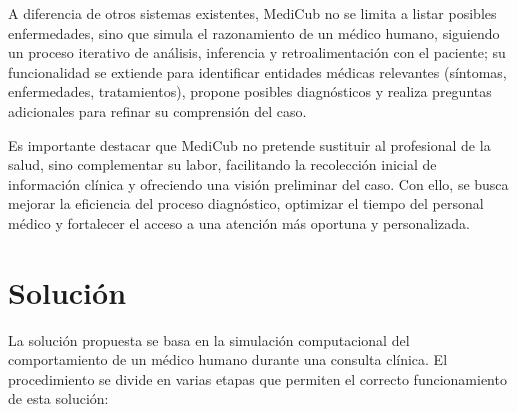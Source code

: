 \documentclass{llncs}
\begin{document}
A diferencia de otros sistemas existentes, MediCub no se limita a listar posibles enfermedades, sino que simula el razonamiento de un médico humano, siguiendo un proceso iterativo
de análisis, inferencia y retroalimentación con el paciente; su funcionalidad se extiende para identificar entidades médicas relevantes (síntomas, enfermedades, tratamientos), propone
posibles diagnósticos y realiza preguntas adicionales para refinar su comprensión del caso.

Es importante destacar que MediCub no pretende sustituir al profesional de la salud, sino complementar su labor, facilitando la recolección inicial de información clínica y ofreciendo 
una visión preliminar del caso. Con ello, se busca mejorar la eficiencia del proceso diagnóstico, optimizar el tiempo del personal médico y fortalecer el acceso a una atención más oportuna
y personalizada.

\section{Solución}

La solución propuesta se basa en la simulación computacional del comportamiento de un médico humano durante una consulta clínica. El procedimiento se divide en varias etapas que permiten el correcto
funcionamiento de esta solución:
\end{document}
